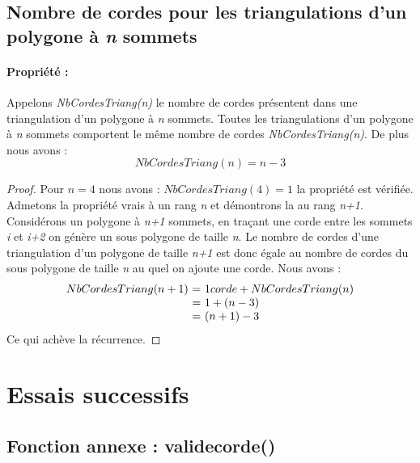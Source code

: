 \documentclass[a4paper,10pt]{article}
\begin{document}
\subsection{Nombre de cordes pour les triangulations d'un polygone à \emph{n} sommets}

\paragraph{Propriété :}  
Appelons \emph{NbCordesTriang(n)} le nombre de cordes présentent dans une triangulation d'un polygone à \emph{n} sommets.
Toutes les triangulations d'un polygone à \emph{n} sommets comportent le même nombre de cordes \emph{NbCordesTriang(n)}.
De plus nous avons :
\begin{equation} 
NbCordesTriang(n) = n-3
\end{equation}

\begin{proof}
Pour \(n = 4\) nous avons : \(NbCordesTriang(4) = 1 \) la propriété est vérifiée. \\
Admetons la propriété vrais à un rang \emph{n} et démontrons la au rang \emph{n+1}. \\
Considérons un polygone à \emph{n+1} sommets, en traçant une corde entre les sommets \emph{i} et \emph{i+2} on génère un sous polygone de taille \emph{n}.
Le nombre de cordes d'une triangulation d'un polygone de taille \emph{n+1} est donc égale au nombre de cordes du sous polygone de taille \emph{n} au quel on ajoute une corde.
Nous avons :\\
\[
\begin{array}{r @{=} l}
NbCordesTriang(n+1) \ & \  1 corde + NbCordesTriang(n) \\
			  & \ 1 + (n-3) \\
			  & \ (n+1) - 3
\end{array}
\]
Ce qui achève la récurrence.
\end{proof}



\section{Essais successifs}


\subsection{Fonction annexe : validecorde()}
\end{document}
